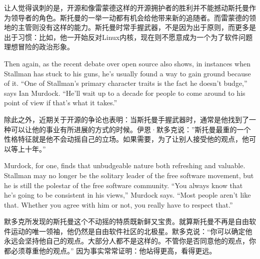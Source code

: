 \ifdefined\chs
让人觉得讽刺的是，开源和像雷蒙德这样的开源拥护者的胜利并不能撼动斯托曼作为领导者的角色。斯托曼的一举一动都有机会给他带来新的追随者。而雷蒙德的领地的主管则没有这样的能力。斯托曼时常手握武器，不是因为出于原则，而更多是出于习惯：比如，他一开始反对Linux内核，现在则不愿意成为一个为了软件问题理想冒险的政治形象。
\fi



\ifdefined\eng
Then again, as the recent debate over open source also shows, in instances when Stallman has stuck to his guns, he's usually found a way to gain ground because of it. ``One of Stallman's primary character traits is the fact he doesn't budge,'' says Ian Murdock. ``He'll wait up to a decade for people to come around to his point of view if that's what it takes.''
\fi

\ifdefined\chs
除此之外，近期关于开源的争论也表明：当斯托曼手握武器时，通常是他找到了一种可以让他的事业有所进展的方式的时候。伊恩·默多克说：''斯托曼最重的一个性格特征就是他不会动摇自己的立场。如果需要，为了让别人接受他的观点，他可以等上十年。''
\fi

\ifdefined\eng
Murdock, for one, finds that unbudgeable nature both refreshing and valuable. Stallman may no longer be the solitary leader of the free software movement, but he is still the polestar of the free software community. ``You always know that he's going to be consistent in his views,'' Murdock says. ``Most people aren't like that. Whether you agree with him or not, you really have to respect that.''
\fi

\ifdefined\chs
默多克所发现的斯托曼这个不动摇的特质既新鲜又宝贵。就算斯托曼不再是自由软件运动的唯一领袖，他仍然是自由软件社区的北极星。默多克说：``你可以确定他永远会坚持他自己的观点。大部分人都不是这样的。不管你是否同意他的观点，你都必须尊重他的观点。'' 因为事实常常证明：他站得更高，看得更远。
\fi

\theendnotes
\setcounter{endnote}{0}
